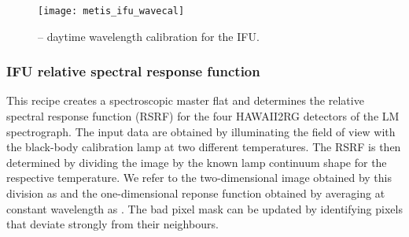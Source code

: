 \begin{figure}[hb]
  \centering
  \texttt{[image: metis\_ifu\_wavecal]}
  \caption[Recipe: ]{ --
    daytime wavelength calibration for the IFU.}
  \label{fig:metis_ifu_wavecal}
\end{figure}


\clearpage
\subsubsection{IFU relative spectral response function}
\label{sssec:ifu_rsrf}
\label{rec:metis_ifu_rsrf}

This recipe creates a spectroscopic master flat and determines the
relative spectral response function (RSRF) for the four HAWAII2RG
detectors of the LM spectrograph. The input data are obtained by
illuminating the field of view with the black-body calibration lamp at
two different temperatures. The RSRF is then determined by dividing
the image by the known lamp continuum shape for the respective
temperature. We refer to the two-dimensional image obtained by this
division as \hyperref[dataitem:master_flat_ifu]{} and the one-dimensional reponse
function obtained by averaging at constant wavelength as
. The bad pixel mask can be updated by identifying pixels
that deviate strongly from their neighbours.

